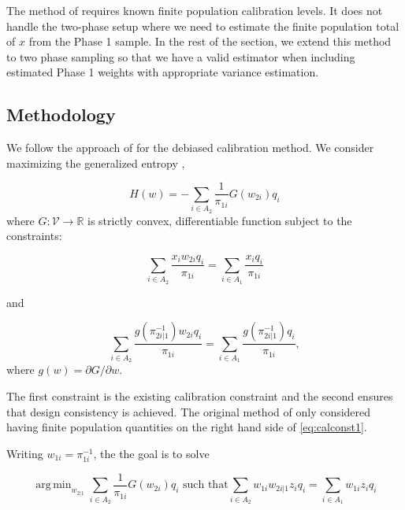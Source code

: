 \documentclass[12pt]{article}
\DeclareMathOperator*{\argmin}{arg\,min}
\newcommand{\R}{\mathbb{R}}
\begin{document}
The method of \cite{kwon2024debiased} requires known finite population 
calibration levels. It does not handle the
two-phase setup where we need to estimate the finite population total of $x$
from the Phase 1 sample. In the rest of the section, we extend this method to 
two phase sampling so that we have a valid 
estimator when including estimated Phase 1 weights with appropriate variance
estimation.

\subsection{Methodology}

We follow the approach of \cite{kwon2024debiased} for the debiased calibration
method. We consider maximizing the generalized entropy \cite{gneiting2007strictly},

\begin{equation}\label{eq:primalloss}
  H(w) = - \sum_{i \in A_2} \frac{1}{\pi_{1i}} G(w_{2i}) q_i
\end{equation}
where $G: \mathcal{V} \to \R$ is strictly convex, differentiable function
subject to the constraints:

\begin{equation}\label{eq:calconst1}
  \sum_{i \in A_2} \frac{x_i w_{2i}q_i}{\pi_{1i}} = 
\sum_{i \in A_1} \frac{x_iq_i}{\pi_{1i}}
\end{equation}

and 

\begin{equation}\label{eq:calconst2}
  \sum_{i \in A_2} \frac{g(\pi_{2i|1}^{-1})w_{2i}q_i}{\pi_{1i}} = 
  \sum_{i \in A_1} \frac{g(\pi_{2i|1}^{-1})q_i}{\pi_{1i}}, 
\end{equation}
where $g(w) = \partial G / \partial w$. 

The first constraint is the existing calibration constraint and the second
ensures that design consistency is achieved. 
The original method of \cite{kwon2024debiased} only considered having finite
population quantities on the right hand side of \eqref{eq:calconst1}.

Writing $w_{1i} = \pi_{1i}^{-1}$, the the goal is to solve

\begin{equation}\label{eq:primal}
  \argmin_{w_{2|1}} \sum_{i \in A_2} \frac{1}{\pi_{1i}} G(w_{2i}) q_i 
  \text{ such that}
  \sum_{i \in A_2} w_{1i} w_{2i|1} z_i q_i = \sum_{i \in A_1} w_{1i} z_i q_i
\end{equation}
\end{document}
